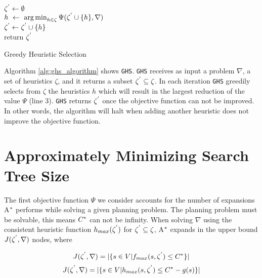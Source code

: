 \begin{algorithm}

$\zeta\sp{'} \leftarrow \emptyset$\\
 {
	$h\ \leftarrow\ \argminA_{h \in \zeta}  \Psi(\zeta\sp{'} \cup \{h\}, \nabla)$\\
	$\zeta\sp{'} \leftarrow \zeta\sp{'} \cup \{h\}$\\
} 
return $\zeta\sp{'}$
\caption{Greedy Heuristic Selection}
\label{alg:ghs_algorithm}
\end{algorithm}

Algorithm \ref{alg:ghs_algorithm} shows \texttt{GHS}. \texttt{GHS} receives as input a problem $\nabla$, a set of heuristics $\zeta$, and it returns a subset $\zeta\sp{'} \subseteq \zeta$. In each iteration \texttt{GHS} greedily selects from $\zeta$ the heuristics $h$ which will result in the largest reduction of the value $\Psi$ (line 3). \texttt{GHS} returns $\zeta\sp{'}$ once the objective function can not be improved. In other words, the algorithm will halt when adding another heuristic does not improve the objective function.

\section{Approximately Minimizing Search Tree Size}
\noindent
The first objective function $\Psi$ we consider accounts for the number of expansions A$\sp{*}$ performs while solving a given planning problem. The planning problem must be solvable, this means $C\sp{*}$ can not be infinity. When solving $\nabla$ using the consistent heuristic function $h_{max}(\zeta\sp{'})$  for $\zeta\sp{'} \subseteq \zeta$, A$\sp{*}$ expands in the upper bound $J(\zeta\sp{'},\nabla)$ nodes, where

\begin{equation}
J(\zeta\sp{'},\nabla) = |\{s \in V | f_{max}(s,\zeta\sp{'}) \leq C\sp{*}\}|
\label{eq:eq_size_search_tree_1}
\end{equation}
\begin{equation}
J(\zeta\sp{'},\nabla) = |\{s \in V | h_{max}(s,\zeta\sp{'}) \leq C\sp{*} - g(s)\}|
\label{eq:eq_size_search_tree_2}
\end{equation}

